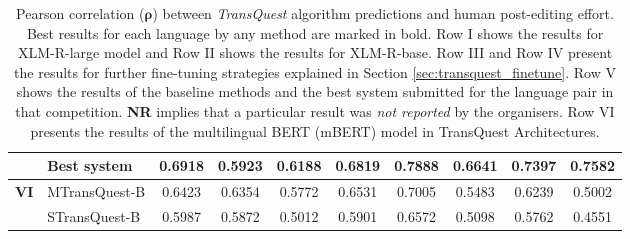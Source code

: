 \begin{table}[t]
\begin{center}
{\begin{tabular}{l l  c c c c c c c c}
			& Best system & 0.6918 & 0.5923 & 0.6188 & 0.6819 & 0.7888 & \textbf{0.6641} & 0.7397 &  \textbf{0.7582} \\
			\midrule
			\multirow{2}{*}{\bf VI} & MTransQuest-B & 0.6423 & 0.6354 & 0.5772 & 0.6531 & 0.7005 & 0.5483 & 0.6239 & 0.5002 \\
			& STransQuest-B & 0.5987 & 0.5872 & 0.5012 & 0.5901 & 0.6572 & 0.5098& 0.5762 & 0.4551 \\
			\bottomrule
		\end{tabular}
	}
	\end{center}
	\caption[Pearson correlation between TransQuest algorithm predictions and human post-editing effort]{Pearson correlation ($\bm{\rho}$) between \textit{TransQuest} algorithm predictions and human post-editing effort. Best results for each language by any method are marked in bold. Row I shows the results for XLM-R-large model and Row II shows the results for XLM-R-base. Row III and Row IV present the results for further fine-tuning strategies explained in Section \ref{sec:transquest_finetune}. Row V shows the results of the baseline methods and the best system submitted for the language pair in that competition. \textbf{NR} implies that a particular result was \textit{not reported} by the organisers. Row VI presents the results of the multilingual BERT (mBERT) model in TransQuest Architectures.} 
	\label{tab:hter_prediction}
\end{table}



